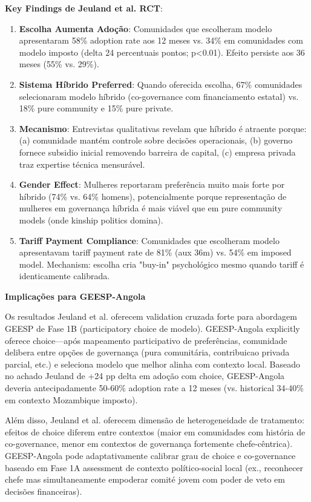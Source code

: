 \documentclass[12pt, a4paper]{article}
\begin{document}
\textbf{Key Findings de Jeuland et al. RCT}:
\begin{enumerate}
\item \textbf{Escolha Aumenta Adoção}: Comunidades que escolheram modelo apresentaram 58\% adoption rate aos 12 meses vs. 34\% em comunidades com modelo imposto (delta 24 percentuais pontos; p<0.01). Efeito persiste aos 36 meses (55\% vs. 29\%).
\item \textbf{Sistema Híbrido Preferred}: Quando oferecida escolha, 67\% comunidades selecionaram modelo híbrido (co-governance com financiamento estatal) vs. 18\% pure community e 15\% pure private.
\item \textbf{Mecanismo}: Entrevistas qualitativas revelam que híbrido é atraente porque: (a) comunidade mantém controle sobre decisões operacionais, (b) governo fornece subsidio inicial removendo barreira de capital, (c) empresa privada traz expertise técnica mensurável.
\item \textbf{Gender Effect}: Mulheres reportaram preferência muito mais forte por híbrido (74\% vs. 64\% homens), potencialmente porque representação de mulheres em governança híbrida é mais viável que em pure community models (onde kinship politics domina).
\item \textbf{Tariff Payment Compliance}: Comunidades que escolheram modelo apresentavam tariff payment rate de 81\% (aux 36m) vs. 54\% em imposed model. Mechanism: escolha cria "buy-in" psychológico mesmo quando tariff é identicamente calibrada.
\end{enumerate}

\textbf{Implicações para GEESP-Angola}

Os resultados Jeuland et al. oferecem validation cruzada forte para abordagem GEESP de Fase 1B (participatory choice de modelo). GEESP-Angola explicitly oferece choice—após mapeamento participativo de preferências, comunidade delibera entre opções de governança (pura comunitária, contribuicao privada parcial, etc.) e seleciona modelo que melhor alinha com contexto local. Baseado no achado Jeuland de +24 pp delta em adoção com choice, GEESP-Angola deveria antecipadamente 50-60\% adoption rate a 12 meses (vs. historical 34-40\% em contexto Mozambique imposto).

Além disso, Jeuland et al. oferecem dimensão de heterogeneidade de tratamento: efeitos de choice diferem entre contextos (maior em comunidades com história de co-governance, menor em contextos de governança fortemente chefe-cêntrica). GEESP-Angola pode adaptativamente calibrar grau de choice e co-governance baseado em Fase 1A assessment de contexto político-social local (ex., reconhecer chefe mas simultaneamente empoderar comité jovem com poder de veto em decisões financeiras).
\end{document}
